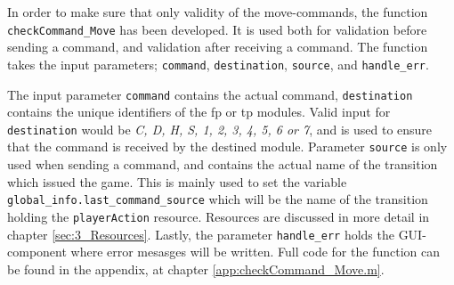 \documentclass[runningheads,a4paper]{llncs}
\begin{document}
In order to make sure that only validity of the move-commands, the function \verb!checkCommand_Move! has been developed. It is used both for validation before sending a command, and validation after receiving a command. The function takes the input parameters; \verb!command!, \verb!destination!, \verb!source!, and \verb!handle_err!. 
\newline

The input parameter \verb!command! contains the actual command, \verb!destination! contains the unique identifiers of the \ac{fp} or \ac{tp} modules. Valid input for \verb!destination! would be \textit{C, D, H, S, 1, 2, 3, 4, 5, 6 or 7}, and is used to ensure that the command is received by the destined module. Parameter \verb!source! is only used when sending a command, and contains the actual name of the transition which issued the game. This is mainly used to set the variable \verb!global_info.last_command_source! which will be the name of the transition holding the \verb!playerAction! resource. Resources are discussed in more detail in chapter \ref{sec:3_Resources}. Lastly, the parameter \verb!handle_err! holds the GUI-component where error mesasges will be written. Full code for the function can be found in the appendix, at chapter \ref{app:checkCommand_Move.m}.
\\
\end{document}
